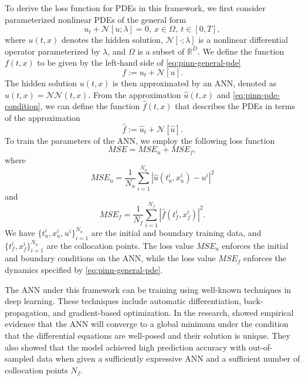 To derive the loss function for \glspl{PDE} in this framework, we first consider parameterized nonlinear \glspl{PDE} of the general form
\begin{equation}
    u_t + \mathcal{N}[u; \lambda] = 0,\ x \in \Omega,\ t \in [0, T],
    \label{eq:pinn-general-pde}
\end{equation}
where $u(t, x)$ denotes the hidden solution, $\mathcal{N}[\cdot; \lambda]$ is a nonlinear differential operator parameterized by $\lambda$, and $\Omega$ is a subset of $\mathbb{R}^D$.
We define the function $f(t, x)$ to be given by the left-hand side of \autoref{eq:pinn-general-pde}
\begin{equation}
    f := u_t + \mathcal{N}[u].
    \label{eq:pinn-pde-condition}
\end{equation}
The hidden solution $u(t, x)$ is then approximated by an \gls{ANN}, denoted as $\hat{u}(t, x) = \mathcal{NN}(t, x)$.
From the approximation $\hat{u}(t, x)$ and \autoref{eq:pinn-pde-condition}, we can define the function $\hat{f}(t, x)$ that describes the \glspl{PDE} in terms of the approximation
\begin{equation*}
    \hat{f} := \hat{u}_t + \mathcal{N}[\hat{u}].
\end{equation*}
To train the parameters of the \gls{ANN}, we employ the following loss function
\begin{equation*}
    MSE = MSE_u + MSE_f,
\end{equation*}
where
\begin{equation*}
    MSE_u = \frac{1}{N_u} \sum_{i=1}^{N_u} |\hat{u}(t_u^i, x_u^i) - u^i|^2
\end{equation*}
and
\begin{equation*}
    MSE_f = \frac{1}{N_f} \sum_{i=1}^{N_f} |\hat{f}(t_f^i, x_f^i)|^2.
\end{equation*}
We have $\{t_u^i, x_u^i, u^i\}_{i=1}^{N_u}$ are the initial and boundary training data, and $\{t_f^i, x_f^i\}_{i=1}^{N_u}$ are the collocation points.
The loss value $MSE_u$ enforces the initial and boundary conditions on the \gls{ANN}, while the loss value $MSE_f$ enforces the dynamics specified by \autoref{eq:pinn-general-pde}.

The \gls{ANN} under this framework can be training using well-known techniques in deep learning.
These techniques include automatic differentiation, back-propagation, and gradient-based optimization.
In the research, \citeauthor{raissiPhysicsinformedNeuralNetworks2019} showed empirical evidence that the \gls{ANN} will converge to a global minimum under the condition that the differential equations are well-posed and their solution is unique.
They also showed that the model achieved high prediction accuracy with out-of-sampled data when given a sufficiently expressive \gls{ANN} and a sufficient number of collocation points $N_f$.